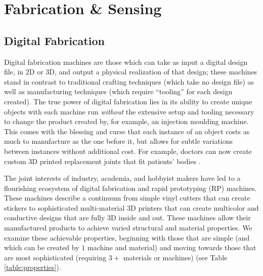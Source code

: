 \chapter{Fabrication \& Sensing}

\section{Digital Fabrication}

Digital fabrication machines are those which can take as input a digital design file, in 2D or 3D, and output a physical realization of that design; these machines stand in contrast to traditional crafting techniques (which take no design file) as well as manufacturing techniques (which require ``tooling'' for each design created). The true power of digital fabrication lies in its ability to create unique objects with each machine run \emph{without} the extensive setup and tooling necessary to change the product created by, for example, an injection moulding machine. This comes with the blessing and curse that each instance of an object costs as much to manufacture as the one before it, but allows for subtle variations between instances without additional cost. For example, doctors can now create custom 3D printed replacement joints that fit patients' bodies \cite{findref}.

The joint interests of industry, academia, and hobbyist makers have led to a flourishing ecosystem of digital fabrication and rapid prototyping (RP) machines. These machines describe a continuum from simple vinyl cutters that can create stickers to sophisticated multi-material 3D printers that can create multicolor and conductive designs that are fully 3D inside and out. These machines allow their manufactured products to achieve varied structural and material properties. We examine these achievable properties, beginning with those that are simple (and which can be created by $1$ machine and material) and moving towards those that are most sophisticated (requiring $3+$ materials or machines) (see Table \ref{table:properties}).


